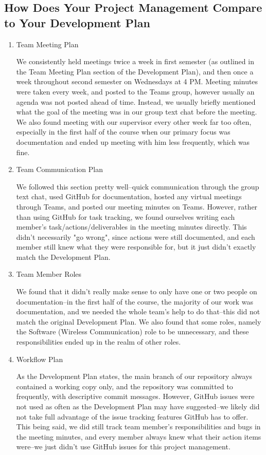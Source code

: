 \documentclass{article}
\begin{document}
\subsection{How Does Your Project Management Compare to Your Development Plan}

\begin{enumerate}

\item{Team Meeting Plan}

 We consistently held meetings twice a week in first semester (as outlined in the Team Meeting Plan section of the Development Plan), and then once a week throughout second semester on Wednesdays at 4 PM. Meeting minutes were taken every week, and posted to the Teams group, however usually an agenda was not posted ahead of time. Instead, we usually briefly mentioned what the goal of the meeting was in our group text chat before the meeting. We also found meeting with our supervisor every other week far too often, especially in the first half of the course when our primary focus was documentation and ended up meeting with him less frequently, which was fine. 

\item{Team Communication Plan}

We followed this section pretty well--quick communication through the group text chat, used GitHub for documentation, hosted any virtual meetings through Teams, and posted our meeting minutes on Teams. However, rather than using GitHub for task tracking, we found ourselves writing each member's task/actions/deliverables in the meeting minutes directly. This didn't necessarily "go wrong", since actions were still documented, and each member still knew what they were responsible for, but it just didn't exactly match the Development Plan. 

\item{Team Member Roles}

    We found that it didn't really make sense to only have one or two people on documentation--in the first half of the course, the majority of our work was documentation, and we needed the whole team's help to do that--this did not match the original Development Plan. We also found that some roles, namely the Software (Wireless Communication) role to be unnecessary, and these responsibilities ended up in the realm of other roles.  

\item{Workflow Plan}

As the Development Plan states, the main branch of our repository always contained a working copy only, and the repository was committed to frequently, with descriptive commit messages. However, GitHub issues were not used as often as the Development Plan may have suggested--we likely did not take full advantage of the issue tracking features GitHub has to offer. This being said, we did still track team member's responsibilities and bugs in the meeting minutes, and every member always knew what their action items were--we just didn't use GitHub issues for this project management.


\end{enumerate}
\end{document}
